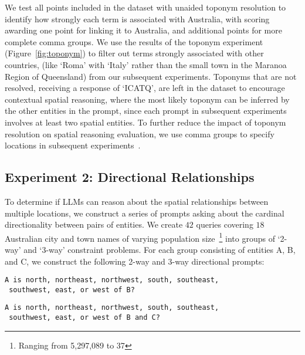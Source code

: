 \noindent We test all points included in the dataset with unaided toponym resolution to identify how strongly each term is associated with Australia, with scoring awarding one point for linking it to Australia, and additional points for more complete comma groups.
We use the results of the toponym experiment (Figure~\ref{fig:toponym}) to filter out terms strongly associated with other countries, (like `Roma' with `Italy' rather than the small town in the Maranoa Region of Queensland) from our subsequent experiments. 
Toponyms that are not resolved, receiving a response of `ICATQ', are left in the dataset to encourage contextual spatial reasoning, where the most likely toponym can be inferred by the other entities in the prompt, since each prompt in subsequent experiments involves at least two spatial entities.
To further reduce the impact of toponym resolution on spatial reasoning evaluation, we use comma groups to specify locations in subsequent experiments~\cite{Lieberman2010}.






\subsection{Experiment 2: Directional Relationships}

To determine if LLMs can reason about the spatial relationships between multiple locations, we construct a series of prompts asking about the cardinal directionality between pairs of entities.
We create $42$ queries covering $18$ Australian city and town names of varying population size~\footnote{Ranging from 5,297,089 to 37} into groups of `2-way' and `3-way' constraint problems.
For each group consisting of entities A, B, and C, we construct the following 2-way and 3-way directional prompts: 

\begin{lstlisting}[title=Prompt 3: 2-way Directional Prompt]
 A is north, northeast, northwest, south, southeast, 
 southwest, east, or west of B?
\end{lstlisting}

\begin{lstlisting}[title=Prompt 4: 3-way Directional Prompt]
 A is north, northeast, northwest, south, southeast, 
 southwest, east, or west of B and C?
\end{lstlisting}

